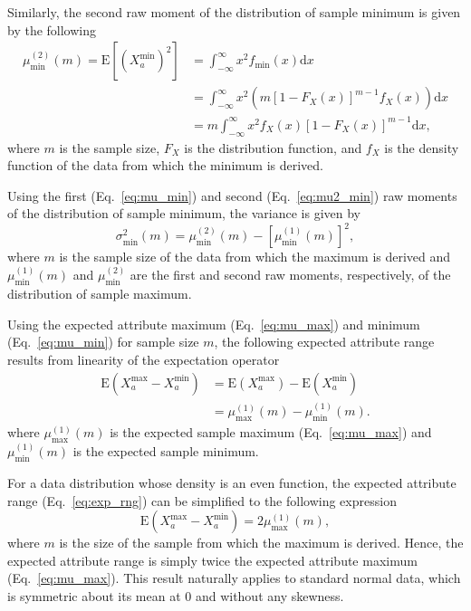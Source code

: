 \documentclass[10pt,letterpaper]{article}
\begin{document}
Similarly, the second raw moment of the distribution of sample minimum is given by the following
%
\begin{equation}\label{eq:mu2_min}
\begin{aligned}
\mu^{(2)}_\text{min}(m) = \text{E}[(X^\text{min}_a)^2] &= \int_{-\infty}^{\infty}x^2 f_\text{min}(x)\text{d}x \\
&= \int_{-\infty}^{\infty}x^2 \left(m [1 - F_X(x)]^{m-1} f_X(x)\right)\text{d}x \\
&= m \int_{-\infty}^{\infty}x^2 f_X(x) [1 - F_X(x)]^{m-1}\text{d}x,
\end{aligned}
\end{equation}
%
where $m$ is the sample size, $F_X$ is the distribution function, and $f_X$ is the density function of the data from which the minimum is derived.

Using the first (Eq.~\ref{eq:mu_min}) and second (Eq.~\ref{eq:mu2_min}) raw moments of the distribution of sample minimum, the variance is given by
%
\begin{equation}\label{eq:sig_min}
\sigma^2_\text{min}(m) = \mu^{(2)}_\text{min}(m) - \left[\mu^{(1)}_\text{min}(m)\right]^2,
\end{equation}
%
where $m$ is the sample size of the data from which the maximum is derived and $\mu^{(1)}_\text{min}(m)$ and $\mu^{(2)}_\text{min}$ are the first and second raw moments, respectively, of the distribution of sample maximum.

Using the expected attribute maximum (Eq.~\ref{eq:mu_max}) and minimum (Eq.~\ref{eq:mu_min}) for sample size $m$, the following expected attribute range results from linearity of the expectation operator
%
\begin{equation}\label{eq:exp_rng}
\begin{aligned}
\text{E}(X^\text{max}_a - X^\text{min}_a) &= \text{E}(X^\text{max}_a) - \text{E}(X^\text{min}_a) \\
&= \mu^{(1)}_\text{max}(m) - \mu^{(1)}_\text{min}(m).
\end{aligned}
\end{equation}
%
where $\mu^{(1)}_\text{max}(m)$ is the expected sample maximum (Eq.~\ref{eq:mu_max}) and $\mu^{(1)}_\text{min}(m)$ is the expected sample minimum.

For a data distribution whose density is an even function, the expected attribute range (Eq.~\ref{eq:exp_rng}) can be simplified to the following expression
%
\begin{equation}\label{eq:exp_rng_symm}
\text{E}(X^\text{max}_a - X^\text{min}_a) = 2 \mu^{(1)}_\text{max}(m),
\end{equation}
%
where $m$ is the size of the sample from which the maximum is derived. Hence, the expected attribute range is simply twice the expected attribute maximum (Eq.~\ref{eq:mu_max}). This result naturally applies to standard normal data, which is symmetric about its mean at 0 and without any skewness.  
\end{document}
